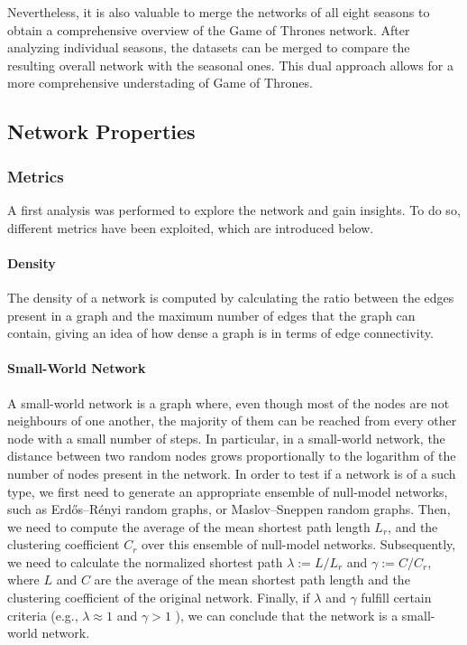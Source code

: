 \documentclass[10pt,twocolumn,letterpaper]{article}
\begin{document}
Nevertheless, it is also valuable to merge the networks of all eight seasons to obtain a comprehensive overview of the Game of Thrones network. After analyzing individual seasons, the datasets can be merged to compare the resulting overall network with the seasonal ones. This dual approach allows for a more comprehensive understading of Game of Thrones.

\subsection{Network Properties}

\subsubsection{Metrics}

A first analysis was performed to explore the network and gain insights. To do so, different metrics have been exploited, which are introduced below.

\paragraph{Density}

The density of a network is computed by calculating the ratio between the edges present in a graph and the maximum number of edges that the graph can contain, giving an idea of how dense a graph is in terms of edge connectivity. 

\paragraph{Small-World Network}

A small-world network is a graph where, even though most of the nodes are not neighbours of one another, the majority of them can be reached from every other node with a small number of steps. In particular, in a small-world network, the distance between two random nodes grows proportionally to the logarithm of the number of nodes present in the network. 
In order to test if a network is of a such type, we first need to generate an appropriate ensemble of null-model networks, such as Erdős–Rényi random graphs, or Maslov–Sneppen random graphs. Then, we need to compute the average of the mean shortest path length $L_r$, and the clustering coefficient $C_r$ over this ensemble of null-model networks. Subsequently, we need to calculate the normalized shortest path $\lambda:=L / L_{r}$ and $\gamma:=C / C_{r}$, where $L$ and $C$ are the average of the mean shortest path length and the clustering coefficient of the original network. Finally, if $\lambda$ and $\gamma$ fulfill certain criteria (e.g., $\lambda \approx 1$ and $\gamma>1$ ), we can conclude that the network is a small-world network.
\end{document}
